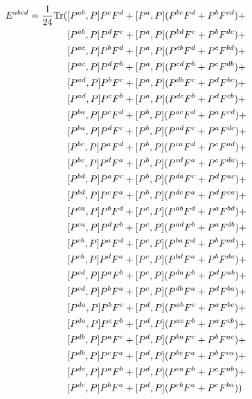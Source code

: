 \documentclass[prl,aps,twocolumn,showpacs,twocolumngrid,superbib]{revtex4}
\def\Tr{{\rm Tr}}
\begin{document}
\begin{equation}
\begin{split}
E^{abcd}=\frac{1}{24}\Tr(&[P^{ab},P] P^c F^d +[P^a,P](P^{bc} F^d + P^b F^{cd})+\\
                         &[P^{ab},P] P^d F^c +[P^a,P](P^{bd} F^c + P^b F^{dc})+\\
                         &[P^{ac},P] P^b F^d +[P^a,P](P^{cb} F^d + P^c F^{bd})+\\
                         &[P^{ac},P] P^d F^b +[P^a,P](P^{cd} F^b + P^c F^{db})+\\
                         &[P^{ad},P] P^b F^c +[P^a,P](P^{db} F^c + P^d F^{bc})+\\
                         &[P^{ad},P] P^c F^b +[P^a,P](P^{dc} F^b + P^d F^{cb})+\\
%
                         &[P^{ba},P] P^c F^d +[P^b,P](P^{ac} F^d + P^a F^{cd})+\\
                         &[P^{ba},P] P^d F^c +[P^b,P](P^{ad} F^c + P^a F^{dc})+\\
                         &[P^{bc},P] P^a F^d +[P^b,P](P^{ca} F^d + P^c F^{ad})+\\
                         &[P^{bc},P] P^d F^a +[P^b,P](P^{cd} F^a + P^c F^{da})+\\
                         &[P^{bd},P] P^a F^c +[P^b,P](P^{da} F^c + P^d F^{ac})+\\
                         &[P^{bd},P] P^c F^a +[P^b,P](P^{dc} F^a + P^d F^{ca})+\\
%
                         &[P^{ca},P] P^b F^d +[P^c,P](P^{ab} F^d + P^a F^{bd})+\\
                         &[P^{ca},P] P^d F^b +[P^c,P](P^{ad} F^b + P^a F^{db})+\\
                         &[P^{cb},P] P^a F^d +[P^c,P](P^{ba} F^d + P^b F^{ad})+\\
                         &[P^{cb},P] P^d F^a +[P^c,P](P^{bd} F^a + P^b F^{da})+\\
                         &[P^{cd},P] P^a F^b +[P^c,P](P^{da} F^b + P^d F^{ab})+\\
                         &[P^{cd},P] P^b F^a +[P^c,P](P^{db} F^a + P^d F^{ba})+\\
%
                         &[P^{da},P] P^b F^c +[P^d,P](P^{ab} F^c + P^a F^{bc})+\\
                         &[P^{da},P] P^c F^b +[P^d,P](P^{ac} F^b + P^a F^{cb})+\\
                         &[P^{db},P] P^a F^c +[P^d,P](P^{ba} F^c + P^b F^{ac})+\\
                         &[P^{db},P] P^c F^a +[P^d,P](P^{bc} F^a + P^b F^{ca})+\\
                         &[P^{dc},P] P^a F^b +[P^d,P](P^{ca} F^b + P^c F^{ab})+\\
                         &[P^{dc},P] P^b F^a +[P^d,P](P^{cb} F^a + P^c F^{ba}))\\
\end{split}
\end{equation}
\end{document}
